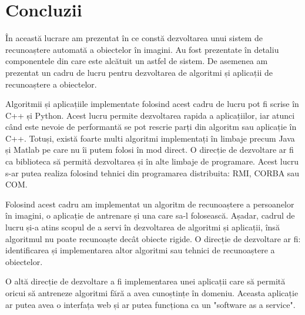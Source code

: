 \chapter{Concluzii}

În această lucrare am prezentat în ce constă dezvoltarea unui sistem de recunoaștere automată a obiectelor în imagini. Au fost prezentate în detaliu componentele din care este alcătuit un astfel de sistem. De asemenea am prezentat un cadru de lucru pentru dezvoltarea de algoritmi și aplicații de recunoaștere a obiectelor.

Algoritmii și aplicațiile implementate folosind acest cadru de lucru pot fi scrise în C++ și Python.
Acest lucru permite dezvoltarea rapida a aplicațiilor, iar atunci când este nevoie de performantă se pot rescrie parți din algoritm sau aplicație în C++.
Totuși, există foarte multi algoritmi implementați în limbaje precum Java și Matlab pe care nu îi putem folosi în mod direct.
O direcție de dezvoltare ar fi ca biblioteca să permită dezvoltarea și în alte limbaje de programare. Acest lucru s-ar putea realiza folosind tehnici din programarea distribuita: RMI, CORBA sau COM.

Folosind acest cadru am implementat un algoritm de recunoaștere a persoanelor în imagini, o aplicație de antrenare și una care sa-l folosească.
Așadar, cadrul de lucru și-a atins scopul de a servi în dezvoltarea de algoritmi și aplicații, însă algoritmul nu poate recunoaște decât obiecte rigide.
O direcție de dezvoltare ar fi: identificarea și implementarea altor algoritmi sau tehnici de recunoaștere a obiectelor.

O altă direcție de dezvoltare a fi implementarea unei aplicații care să permită oricui să antreneze algoritmi fără a avea cunoștințe în domeniu. Aceasta aplicație ar putea avea o interfața web și ar putea funcționa ca un "software as a service".




